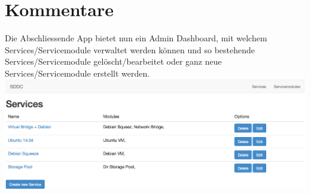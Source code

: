 \section{Kommentare}

Die Abschliessende App bietet nun ein Admin Dashboard, mit welchem 
Services/Servicemodule
verwaltet werden können und so bestehende Services/Servicemodule gelöscht/bearbeitet oder ganz 
neue Services/Servicemodule erstellt werden.
\newline
\includegraphics[width=\textwidth]{./10_Protokolle/04_Testprotokoll/images/Sprint3/dashboard}

